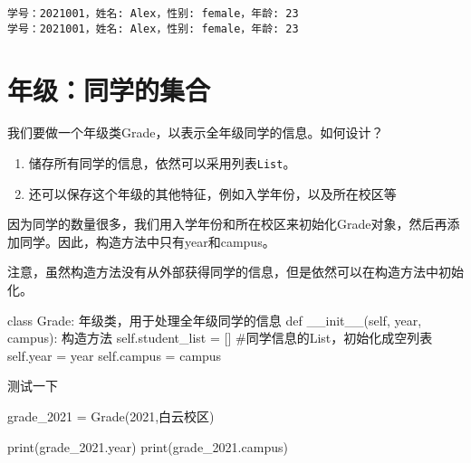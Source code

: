 \documentclass[
  letterpaper,
  DIV=11,
  numbers=noendperiod]{scrreprt}
\newenvironment{Shaded}{\begin{snugshade}}{\end{snugshade}}
\newcommand{\BuiltInTok}[1]{\textcolor[rgb]{0.00,0.23,0.31}{#1}}
\newcommand{\CommentTok}[1]{\textcolor[rgb]{0.37,0.37,0.37}{#1}}
\newcommand{\DecValTok}[1]{\textcolor[rgb]{0.68,0.00,0.00}{#1}}
\newcommand{\FunctionTok}[1]{\textcolor[rgb]{0.28,0.35,0.67}{#1}}
\newcommand{\KeywordTok}[1]{\textcolor[rgb]{0.00,0.23,0.31}{#1}}
\newcommand{\NormalTok}[1]{\textcolor[rgb]{0.00,0.23,0.31}{#1}}
\newcommand{\OperatorTok}[1]{\textcolor[rgb]{0.37,0.37,0.37}{#1}}
\newcommand{\StringTok}[1]{\textcolor[rgb]{0.13,0.47,0.30}{#1}}
\newcommand{\VariableTok}[1]{\textcolor[rgb]{0.07,0.07,0.07}{#1}}
\providecommand{\tightlist}{%
  \setlength{\itemsep}{0pt}\setlength{\parskip}{0pt}}\usepackage{longtable,booktabs,array}
\begin{document}
\begin{verbatim}
学号：2021001，姓名: Alex，性别: female，年龄: 23
学号：2021001，姓名: Alex，性别: female，年龄: 23
\end{verbatim}

\hypertarget{ux5e74ux7ea7ux540cux5b66ux7684ux96c6ux5408}{%
\section{年级：同学的集合}\label{ux5e74ux7ea7ux540cux5b66ux7684ux96c6ux5408}}

我们要做一个年级类Grade，以表示全年级同学的信息。如何设计？

\begin{enumerate}
\def\labelenumi{\arabic{enumi}.}
\tightlist
\item
  储存所有同学的信息，依然可以采用列表\texttt{List}。
\item
  还可以保存这个年级的其他特征，例如入学年份，以及所在校区等
\end{enumerate}

因为同学的数量很多，我们用入学年份和所在校区来初始化Grade对象，然后再添加同学。因此，构造方法中只有year和campus。

注意，虽然构造方法没有从外部获得同学的信息，但是依然可以在构造方法中初始化。

\begin{Shaded}
\begin{Highlighting}[]
\KeywordTok{class}\NormalTok{ Grade:}
    \CommentTok{\textquotesingle{}\textquotesingle{}\textquotesingle{}}
\CommentTok{    年级类，用于处理全年级同学的信息}
\CommentTok{    \textquotesingle{}\textquotesingle{}\textquotesingle{}}
    \KeywordTok{def} \FunctionTok{\_\_init\_\_}\NormalTok{(}\VariableTok{self}\NormalTok{, year, campus):}
        \CommentTok{\textquotesingle{}\textquotesingle{}\textquotesingle{}}
\CommentTok{        构造方法}
\CommentTok{        \textquotesingle{}\textquotesingle{}\textquotesingle{}}
        \VariableTok{self}\NormalTok{.student\_list }\OperatorTok{=}\NormalTok{ [] }\CommentTok{\#同学信息的List，初始化成空列表}
        \VariableTok{self}\NormalTok{.year }\OperatorTok{=}\NormalTok{ year}
        \VariableTok{self}\NormalTok{.campus }\OperatorTok{=}\NormalTok{ campus}
\end{Highlighting}
\end{Shaded}

测试一下

\begin{Shaded}
\begin{Highlighting}[]
\NormalTok{grade\_2021 }\OperatorTok{=}\NormalTok{ Grade(}\DecValTok{2021}\NormalTok{,}\StringTok{\textquotesingle{}白云校区\textquotesingle{}}\NormalTok{)}

\BuiltInTok{print}\NormalTok{(grade\_2021.year)}
\BuiltInTok{print}\NormalTok{(grade\_2021.campus)}
\end{Highlighting}
\end{Shaded}
\end{document}
